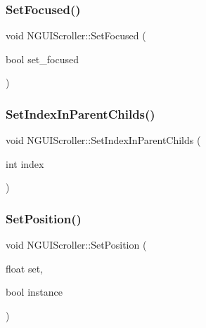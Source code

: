 \subsubsection{\texorpdfstring{Set\+Focused()}{SetFocused()}}
{\footnotesize\ttfamily void N\+G\+U\+I\+Scroller\+::\+Set\+Focused (\begin{DoxyParamCaption}\item[{bool}]{set\+\_\+focused }\end{DoxyParamCaption})}

\hypertarget{class_n_g_u_i_scroller_a20a3e37118cdd15fed96c56b5e147932}{}\label{class_n_g_u_i_scroller_a20a3e37118cdd15fed96c56b5e147932} 
\subsubsection{\texorpdfstring{Set\+Index\+In\+Parent\+Childs()}{SetIndexInParentChilds()}}
{\footnotesize\ttfamily void N\+G\+U\+I\+Scroller\+::\+Set\+Index\+In\+Parent\+Childs (\begin{DoxyParamCaption}\item[{int}]{index }\end{DoxyParamCaption})}

\hypertarget{class_n_g_u_i_scroller_a32426051ca5900c88655363b7d6458ca}{}\label{class_n_g_u_i_scroller_a32426051ca5900c88655363b7d6458ca} 
\subsubsection{\texorpdfstring{Set\+Position()}{SetPosition()}}
{\footnotesize\ttfamily void N\+G\+U\+I\+Scroller\+::\+Set\+Position (\begin{DoxyParamCaption}\item[{float}]{set,  }\item[{bool}]{instance }\end{DoxyParamCaption})}

\hypertarget{class_n_g_u_i_scroller_ac92b89d6e4a7362c44e8047b1e22e7c8}{}\label{class_n_g_u_i_scroller_ac92b89d6e4a7362c44e8047b1e22e7c8} 
